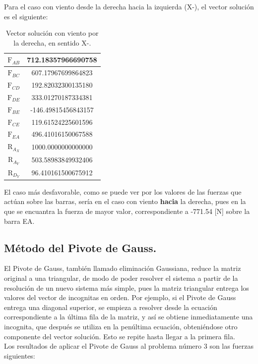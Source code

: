 \documentclass[12pt, notitlepage]{article}
\begin{document}
Para el caso con viento desde la derecha hacia la izquierda (X-), el vector solución es el siguiente:

\begin{table}[H]
\centering
\caption{Vector solución con viento por la derecha, en sentido X-.}
\begin{tabular}{|c|c|} \hline
$\text{F}_{AB}$ & 712.18357966690758 \\ \hline $\text{F}_{BC}$ & 607.17967699864823  \\ \hline $\text{F}_{CD}$ & 192.82032300135180 \\ \hline $\text{F}_{DE}$ & 333.01270187334381 \\ \hline $\text{F}_{BE}$ & -146.49815456843157 \\ \hline $\text{F}_{CE}$ & 119.61524225601596  \\ \hline $\text{F}_{EA}$ & 496.41016150067588 \\ \hline $\text{R}_{A_X}$ & 1000.0000000000000    \\ \hline $\text{R}_{A_Y}$ &  503.58983849932406 \\ \hline $\text{R}_{D_Y}$ & 96.410161500675912 \\ \hline
\end{tabular}
\end{table}

El caso más desfavorable, como se puede ver por los valores de las fuerzas que actúan sobre las barras, sería en el caso con viento \textbf{hacia} la derecha, pues en la que se encuantra la fuerza de mayor valor, correspondiente a -771.54 [N] sobre la barra EA.

\newpage

\subsection{Método del Pivote de Gauss.}

El Pivote de Gauss, también llamado eliminación Gaussiana, reduce la matriz original a una triangular, de modo de poder resolver el sistema a partir de la resolución de un nuevo sistema más simple, pues la matriz triangular entrega los valores del vector de incognitas en orden. Por ejemplo, si el Pivote de Gauss entrega una diagonal superior, se empieza a resolver desde la ecuación correspondiente a la última fila de la matriz, y así se obtiene inmediatamente una incognita, que después se utiliza en la penúltima ecuación, obteniéndose otro componente del vector solución. Esto se repite hasta llegar a la primera fila.\\
Los resultados de aplicar el Pivote de Gauss al problema número 3 son las fuerzas siguientes:
\end{document}
